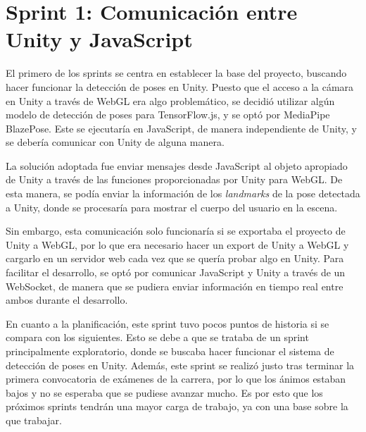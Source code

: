 \section{Sprint 1: Comunicación entre Unity y JavaScript}
\label{anexo3:sec:sprint1}

El primero de los sprints se centra en establecer la base del proyecto, buscando hacer funcionar la
detección de poses en Unity. Puesto que el acceso a la cámara en Unity a través de WebGL era algo
problemático, se decidió utilizar algún modelo de detección de poses para TensorFlow.js, y se optó por
MediaPipe BlazePose. Este se ejecutaría en JavaScript, de manera independiente de Unity, y se debería
comunicar con Unity de alguna manera.

La solución adoptada fue enviar mensajes desde JavaScript al objeto apropiado de Unity a través de
las funciones proporcionadas por Unity para WebGL. De esta manera, se podía enviar la información de los
\textit{landmarks} de la pose detectada a Unity, donde se procesaría para mostrar el cuerpo del usuario
en la escena.

Sin embargo, esta comunicación solo funcionaría si se exportaba el proyecto de Unity a WebGL, por lo
que era necesario hacer un export de Unity a WebGL y cargarlo en un servidor web cada vez que se quería
probar algo en Unity. Para facilitar el desarrollo, se optó por comunicar JavaScript y Unity a través de
un WebSocket, de manera que se pudiera enviar información en tiempo real entre ambos durante el desarrollo.

En cuanto a la planificación, este sprint tuvo pocos puntos de historia si se compara con los siguientes.
Esto se debe a que se trataba de un sprint principalmente exploratorio, donde se buscaba hacer funcionar
el sistema de detección de poses en Unity. Además, este sprint se realizó justo tras terminar la primera
convocatoria de exámenes de la carrera, por lo que los ánimos estaban bajos y no se esperaba que se
pudiese avanzar mucho. Es por esto que los próximos sprints tendrán una mayor carga de trabajo, ya con
una base sobre la que trabajar.


